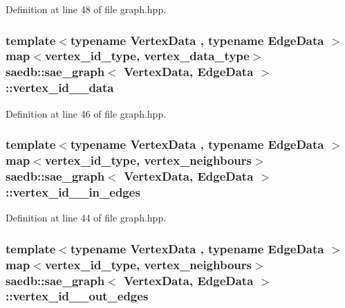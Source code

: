 Definition at line 48 of file graph.\-hpp.

\hypertarget{classsaedb_1_1sae__graph_a62ce6b48cf14e233f705b232b374fe27}{
\subsubsection[{vertex\-\_\-id\-\_\-2\-\_\-data}]{\setlength{\rightskip}{0pt plus 5cm}template$<$typename Vertex\-Data , typename Edge\-Data $>$ map$<${\bf vertex\-\_\-id\-\_\-type}, {\bf vertex\-\_\-data\-\_\-type}$>$ {\bf saedb\-::sae\-\_\-graph}$<$ Vertex\-Data, Edge\-Data $>$\-::vertex\-\_\-id\-\_\-\_\-data}}\label{d6/d2b/classsaedb_1_1sae__graph_a62ce6b48cf14e233f705b232b374fe27}


Definition at line 46 of file graph.\-hpp.

\hypertarget{classsaedb_1_1sae__graph_a29465e678178961ca52a3887cec29062}{
\subsubsection[{vertex\-\_\-id\-\_\-2\-\_\-in\-\_\-edges}]{\setlength{\rightskip}{0pt plus 5cm}template$<$typename Vertex\-Data , typename Edge\-Data $>$ map$<${\bf vertex\-\_\-id\-\_\-type}, {\bf vertex\-\_\-neighbours}$>$ {\bf saedb\-::sae\-\_\-graph}$<$ Vertex\-Data, Edge\-Data $>$\-::vertex\-\_\-id\-\_\-\_\-in\-\_\-edges}}\label{d6/d2b/classsaedb_1_1sae__graph_a29465e678178961ca52a3887cec29062}


Definition at line 44 of file graph.\-hpp.

\hypertarget{classsaedb_1_1sae__graph_ad04eb3952dbc00e6cbe3f2638eb2c2bf}{
\subsubsection[{vertex\-\_\-id\-\_\-2\-\_\-out\-\_\-edges}]{\setlength{\rightskip}{0pt plus 5cm}template$<$typename Vertex\-Data , typename Edge\-Data $>$ map$<${\bf vertex\-\_\-id\-\_\-type}, {\bf vertex\-\_\-neighbours}$>$ {\bf saedb\-::sae\-\_\-graph}$<$ Vertex\-Data, Edge\-Data $>$\-::vertex\-\_\-id\-\_\-\_\-out\-\_\-edges}}\label{d6/d2b/classsaedb_1_1sae__graph_ad04eb3952dbc00e6cbe3f2638eb2c2bf}


